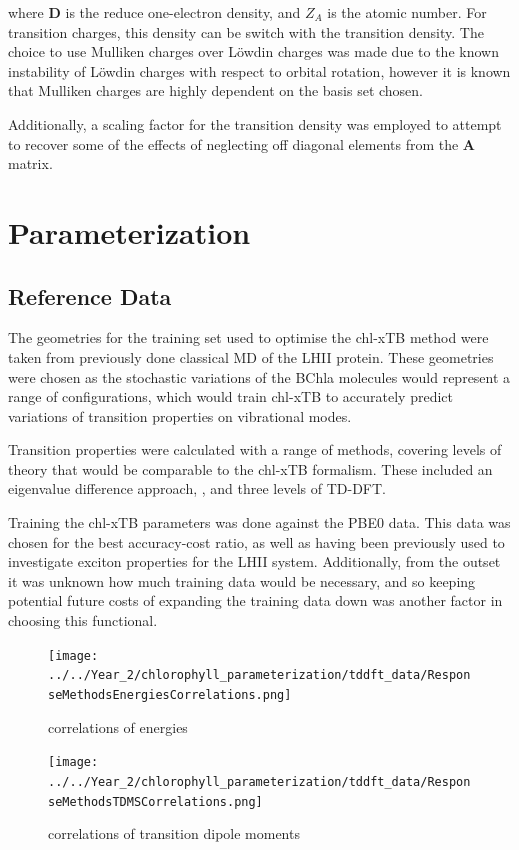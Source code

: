 where $\mathbf{D}$ is the reduce one-electron density, and $Z_A$ is the atomic number.
For transition charges, this density can be switch with the transition density. 
The choice to use Mulliken charges over L{\"o}wdin charges was made due to the known
instability of L{\"o}wdin charges with respect to orbital rotation, however it is
known that Mulliken charges are highly dependent on the basis set chosen. 

Additionally, a scaling factor for the transition density was employed to attempt
to recover some of the effects of neglecting off diagonal elements from the $\mathbf{A}$
matrix.

\afterpartskip
\section{Parameterization}
\label{sec:chl_params}
\subsection{Reference Data}
\label{subsec:ref_data}
The geometries for the training set used to optimise the chl-xTB method were taken
from previously done classical MD of the LHII protein. These geometries were chosen
as the stochastic variations of the BChla molecules would represent a range of
configurations, which would train chl-xTB to accurately predict variations of 
transition properties on vibrational modes.

Transition properties were calculated with a range of methods, covering levels of
theory that would be comparable to the chl-xTB formalism. These included an eigenvalue
difference approach, \dscf, and three levels of TD-DFT. 

Training the chl-xTB parameters was done against the PBE0 data. This data was chosen
for the best accuracy-cost ratio, as well as having been previously used to investigate
exciton properties for the LHII system. Additionally, from the outset it was unknown
how much training data would be necessary, and so keeping potential future costs
of expanding the training data down was another factor in choosing this functional.

\begin{figure}
    \texttt{[image: ../../Year\_2/chlorophyll\_parameterization/tddft\_data/ResponseMethodsEnergiesCorrelations.png]}
    \caption{correlations of energies}
\end{figure}

\begin{figure}
    \texttt{[image: ../../Year\_2/chlorophyll\_parameterization/tddft\_data/ResponseMethodsTDMSCorrelations.png]}
    \caption{correlations of transition dipole moments}
\end{figure}

